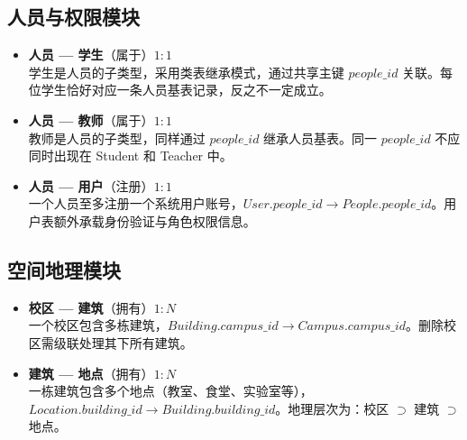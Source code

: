 \documentclass[11pt, a4paper]{article}
\begin{document}
\subsection{人员与权限模块}
\begin{itemize}
    \item \textbf{人员 --- 学生}（属于）\quad $1{:}1$\\
    学生是人员的子类型，采用类表继承模式，通过共享主键 $people\_id$ 关联。每位学生恰好对应一条人员基表记录，反之不一定成立。
    \item \textbf{人员 --- 教师}（属于）\quad $1{:}1$\\
    教师是人员的子类型，同样通过 $people\_id$ 继承人员基表。同一 $people\_id$ 不应同时出现在 Student 和 Teacher 中。
    \item \textbf{人员 --- 用户}（注册）\quad $1{:}1$\\
    一个人员至多注册一个系统用户账号，$User.people\_id \rightarrow People.people\_id$。用户表额外承载身份验证与角色权限信息。
\end{itemize}

\subsection{空间地理模块}
\begin{itemize}
    \item \textbf{校区 --- 建筑}（拥有）\quad $1{:}N$\\
    一个校区包含多栋建筑，$Building.campus\_id \rightarrow Campus.campus\_id$。删除校区需级联处理其下所有建筑。
    \item \textbf{建筑 --- 地点}（拥有）\quad $1{:}N$\\
    一栋建筑包含多个地点（教室、食堂、实验室等），$Location.building\_id \rightarrow Building.building\_id$。地理层次为：校区 $\supset$ 建筑 $\supset$ 地点。
\end{itemize}
\end{document}
